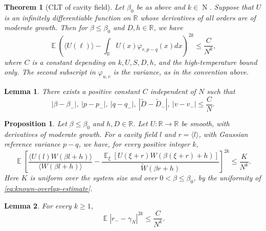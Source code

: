 \documentclass[10pt,a4paper]{amsart}
\newtheorem{theorem}{Theorem}
\newtheorem{lemma}{Lemma}
\newtheorem{proposition}{Proposition}
\providecommand{\Dtil}{\widetilde D}
\DeclareMathOperator{\E}{\mathds{E}}
\DeclareMathOperator{\N}{N}
\providecommand{\R}{\mathbb R}
\providecommand{\Wtil}{\widetilde W}
\renewcommand{\ge}{\geqslant}
\renewcommand{\le}{\leqslant}
\begin{document}
\begin{theorem}[CLT of cavity field]\label{thm:cavity}
Let $\beta_0$ be as above and $k\in\N$. Suppose that $U$ is an infinitely differentiable function on $\R$ whose derivatives of all orders are of moderate growth. Then for $\beta\le \beta_0$ and $D,h\in\R$, we have
\begin{equation}\label{eq:thm-cavity}
  \E\left(\langle U(\ell)\rangle-\int_{\R}U(x)\varphi_{r,p-q}(x)d x\right)^{2k}\le \frac{C}{N^k},
\end{equation}
where $C$ is a constant depending on $k,U,S,D,h$, and the high-temperature bound only. The second subscript in $\varphi_{u,v}$ is the variance, as in the convention above.
\end{theorem}

\begin{lemma}\label{lem:param-comparison}
There exists a positive constant $C$ independent of $N$ such that
\begin{equation}\label{eq:param-comparison}
  |\beta-\beta_-|,  \ |p-p_-|, \ |q-q_-|, \ |\Dtil-\Dtil_-|, \ |v-v_-|\le \frac{C}{N}.
\end{equation}
\end{lemma}

\begin{proposition}\label{prop:ratio}
Let $\beta\le \beta_0$ and $h,D\in\R$. Let $U:\R\to\R$ be smooth, with derivatives of moderate growth. For a cavity field $l$ and $r=\langle l\rangle$, with Gaussian reference variance $p-q$, we have, for every positive integer $k$,
\begin{equation}\label{eq:ratio-estimate}
  \E\left[\frac{\langle U(l)W(\beta l+h)\rangle}{\langle W(\beta l+h)\rangle}
  -\frac{\E_\xi[U(\xi+r)W(\beta(\xi+r)+h)]}{\Wtil(\beta r+h)}\right]^{2k}\le \frac{K}{N^k}.
\end{equation}
Here $K$ is uniform over the system size and over $0<\beta\le\beta_0$, by the uniformity of \eqref{eq:known-overlap-estimate}.
\end{proposition}

\begin{lemma}\label{lem:onsager}
For every $k\ge1$,
\begin{equation}\label{eq:onsager-bound}
  \E|r_- -\gamma_N|^{2k}\le \frac{C}{N^k}.
\end{equation}
\end{lemma}
\end{document}
